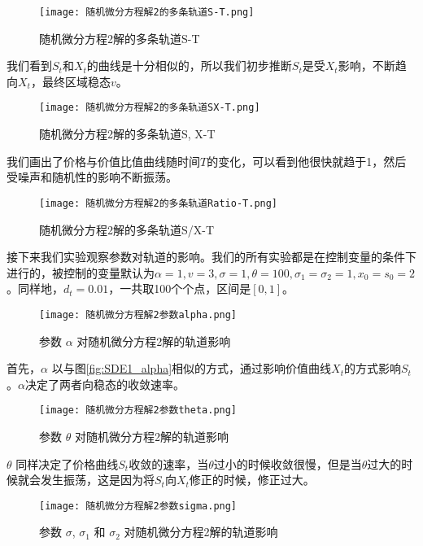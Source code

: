 \documentclass{article}
\begin{document}
\begin{figure}[H]
    \centering
    \texttt{[image: 随机微分方程解2的多条轨道S-T.png]}
    \caption{随机微分方程2解的多条轨道S-T}
    \label{fig:SDE2_S}
    \end{figure}


我们看到$S_t$和$X_t$的曲线是十分相似的，所以我们初步推断$S_t$是受$X_t$影响，不断趋向$X_t$，最终区域稳态$v$。


\begin{figure}[H]
    \centering
    \texttt{[image: 随机微分方程解2的多条轨道SX-T.png]}
    \caption{随机微分方程2解的多条轨道S, X-T}
    \label{fig:SDE2_SX}
    \end{figure}


我们画出了价格与价值比值曲线随时间$T$的变化，可以看到他很快就趋于1，然后受噪声和随机性的影响不断振荡。

\begin{figure}[H]
    \centering
    \texttt{[image: 随机微分方程解2的多条轨道Ratio-T.png]}
    \caption{随机微分方程2解的多条轨道S/X-T}
    \label{fig:SDE2_Ratio}
    \end{figure}


接下来我们实验观察参数对轨道的影响。我们的所有实验都是在控制变量的条件下进行的，被控制的变量默认为$\alpha=1, v=3, \sigma=1, \theta=100, \sigma_1 = \sigma_2 = 1, x_0=s_0=2$。同样地，$d_t = 0.01$，一共取100个个点，区间是$[0, 1]$。


\begin{figure}[H]
    \centering
    \texttt{[image: 随机微分方程解2参数alpha.png]}
    \caption{参数 $\alpha$ 对随机微分方程2解的轨道影响}
    \label{fig:SDE12_alpha}
    \end{figure}

首先，$\alpha$ 以与图\ref{fig:SDE1_alpha}相似的方式，通过影响价值曲线$X_t$的方式影响$S_t$。$\alpha$决定了两者向稳态的收敛速率。


\begin{figure}[H]
    \centering
    \texttt{[image: 随机微分方程解2参数theta.png]}
    \caption{参数 $\theta$ 对随机微分方程2解的轨道影响}
    \label{fig:SDE2_theta}
    \end{figure}

$\theta$ 同样决定了价格曲线$S_t$收敛的速率，当$\theta$过小的时候收敛很慢，但是当$\theta$过大的时候就会发生振荡，这是因为将$S_t$向$X_t$修正的时候，修正过大。


\begin{figure}[H]
    \centering
    \texttt{[image: 随机微分方程解2参数sigma.png]}
    \caption{参数 $\sigma$, $\sigma_1$ 和 $\sigma_2$ 对随机微分方程2解的轨道影响}
    \label{fig:SDE2_sigma}
    \end{figure}    
\end{document}
